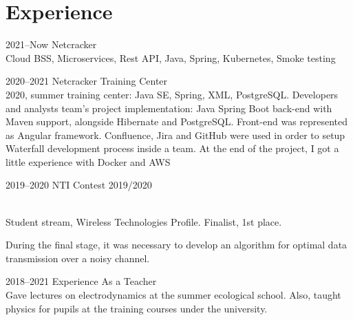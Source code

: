 \documentclass[]{cv-style}          %
\begin{document}
\section{Experience}

\begin{entrylist}

\entry
    {2021--Now}
    {Netcracker}
    {}
    {\\ 
Cloud BSS, Microservices, Rest API, Java, Spring, Kubernetes, Smoke testing}

\entry
    {2020--2021}
    {Netcracker Training Center}
    {}
    {\jobtitle{}\\ 
    2020, summer training center: Java SE, Spring, XML, PostgreSQL. Developers and analysts team's project implementation: Java Spring Boot back-end with Maven support, alongside Hibernate and PostgreSQL. Front-end was represented as Angular framework. Confluence, Jira and GitHub were used in order to setup Waterfall development process inside a team. At the end of the project, I got a little experience with Docker and AWS}

\entry
    {2019--2020}
    {NTI Contest 2019/2020}
    {}
    {\jobtitle{}\\
Student stream, Wireless Technologies Profile. Finalist, 1st place.

During the final stage, it was necessary to develop an algorithm for optimal data transmission over a noisy channel.}


\entry
    {2018--2021}
    {Experience As a Teacher}
    {}
    {\jobtitle{}\\
Gave lectures on electrodynamics at the summer ecological school. Also, taught physics for pupils at the training courses under the university.}


\end{entrylist}
\end{document}
